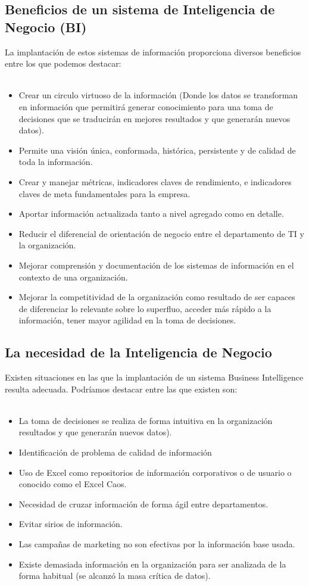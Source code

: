 \documentclass[preprint,12pt]{elsarticle}
\begin{document}
	\subsection{Beneficios de un sistema de Inteligencia de Negocio (BI)}
	La implantación de estos sistemas de información proporciona diversos beneficios entre los que podemos destacar:
\\
\\
	\begin{itemize}
	\item Crear un circulo virtuoso de la información (Donde los datos se transforman en información que permitirá 
		generar conocimiento para una toma de decisiones que se traducirán en mejores resultados y que 
		generarán nuevos datos).
	\item Permite una visión única, conformada, histórica, persistente y de calidad de toda la información. 
	\item Crear y manejar métricas, indicadores claves de rendimiento, e indicadores claves de meta fundamentales 
		para la empresa.
	\item Aportar información actualizada tanto a nivel agregado como en detalle.
	\item Reducir el diferencial de orientación de negocio entre el departamento de TI y la organización. 
	\item Mejorar comprensión y documentación de los sistemas de información en el contexto de una organización.
	\item Mejorar la competitividad de la organización como resultado de ser capaces de diferenciar lo relevante sobre 
		lo superfluo, acceder más rápido a la información, tener mayor agilidad en la toma de decisiones.
	\end{itemize}
	\subsection{La necesidad de la Inteligencia de Negocio}
	Existen situaciones en las que la implantación de un sistema Business Intelligence  resulta adecuada. Podríamos destacar 
	entre las que existen son:
\\
\\
	\begin{itemize}
	\item La toma de decisiones se realiza de forma intuitiva en la organización resultados y que generarán nuevos datos).
	\item Identificación de problema de calidad de información
	\item Uso de Excel como repositorios de información corporativos o de usuario o conocido como el Excel Caos.
	\item Necesidad de cruzar información de forma ágil entre departamentos.
	\item Evitar sirios de información.
	\item Las campañas de marketing no son efectivas por la información base usada. 
	\item Existe demasiada información en la organización para ser analizada de la forma habitual (se alcanzó la masa crítica de datos).
	\end{itemize}
\end{document}
